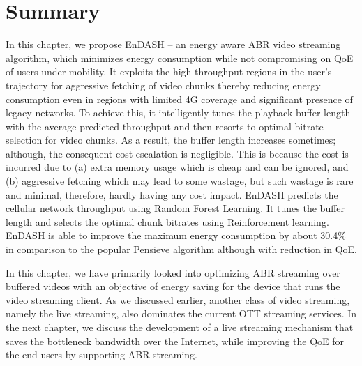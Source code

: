 \section{Summary}\label{sec:chap04:conclusion}
\acresetall
In this chapter, we propose EnDASH -- an energy aware ABR video streaming algorithm, which minimizes energy consumption while not compromising on QoE of users under mobility. It exploits the high throughput regions in the user's trajectory for aggressive fetching of video chunks thereby reducing energy consumption even in regions with limited 4G coverage and significant presence of legacy networks.  To achieve this, it intelligently tunes the playback buffer length with the average predicted throughput and then resorts to optimal bitrate selection for video chunks. As a result, the buffer length increases sometimes; although, the consequent cost  escalation is negligible. This is because the cost is incurred due to  (a) extra memory usage which is cheap  and can be ignored, and (b) aggressive fetching which may lead to some wastage, but such wastage is rare and minimal, therefore, hardly having any cost impact. %
EnDASH predicts the cellular network throughput using Random Forest Learning. It tunes the buffer length and selects the optimal chunk bitrates using Reinforcement learning. EnDASH is able to improve the maximum energy consumption by about 30.4\% in comparison to the popular Pensieve algorithm although with reduction in QoE. 

In this chapter, we have primarily looked into optimizing ABR streaming over buffered videos with an objective of energy saving for the device that runs the video streaming client. As we discussed earlier, another class of video streaming, namely the live streaming, also dominates the current OTT streaming services. In the next chapter, we discuss the development of a live streaming mechanism that saves the bottleneck bandwidth over the Internet, while improving the QoE for the end users by supporting ABR streaming. 